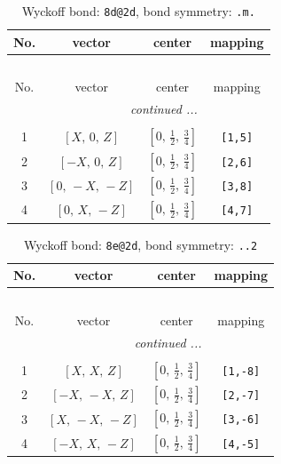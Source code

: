 \documentclass[fleqn,8pt]{jsarticle}
\begin{document}
\begin{longtable}{cccc}
\caption{Wyckoff bond: {\tt 8d@2d}, bond symmetry: {\tt .m.}}
 \\
 \hline \hline
No. & vector & center & mapping \\ \hline \endfirsthead

\multicolumn{3}{l}{\tablename\ \thetable{}} \\
 \hline \hline
No. & vector & center & mapping \\ \hline \endhead

 \hline \hline
\multicolumn{3}{r}{\footnotesize\it continued ...} \\ \endfoot

 \hline \hline
\multicolumn{3}{r}{} \\ \endlastfoot

1 & $\left[ X,\, 0,\, Z \right]$ & $\left[ 0,\, \frac{1}{2},\, \frac{3}{4} \right]$ & {\tt [1,5]} \\ \hline
2 & $\left[ - X,\, 0,\, Z \right]$ & $\left[ 0,\, \frac{1}{2},\, \frac{3}{4} \right]$ & {\tt [2,6]} \\ \hline
3 & $\left[ 0,\, - X,\, - Z \right]$ & $\left[ 0,\, \frac{1}{2},\, \frac{3}{4} \right]$ & {\tt [3,8]} \\ \hline
4 & $\left[ 0,\, X,\, - Z \right]$ & $\left[ 0,\, \frac{1}{2},\, \frac{3}{4} \right]$ & {\tt [4,7]} \\
\end{longtable}
\renewcommand{\arraystretch}{1.2}
\begin{longtable}{cccc}
\caption{Wyckoff bond: {\tt 8e@2d}, bond symmetry: {\tt ..2}}
 \\
 \hline \hline
No. & vector & center & mapping \\ \hline \endfirsthead

\multicolumn{3}{l}{\tablename\ \thetable{}} \\
 \hline \hline
No. & vector & center & mapping \\ \hline \endhead

 \hline \hline
\multicolumn{3}{r}{\footnotesize\it continued ...} \\ \endfoot

 \hline \hline
\multicolumn{3}{r}{} \\ \endlastfoot

1 & $\left[ X,\, X,\, Z \right]$ & $\left[ 0,\, \frac{1}{2},\, \frac{3}{4} \right]$ & {\tt [1,-8]} \\ \hline
2 & $\left[ - X,\, - X,\, Z \right]$ & $\left[ 0,\, \frac{1}{2},\, \frac{3}{4} \right]$ & {\tt [2,-7]} \\ \hline
3 & $\left[ X,\, - X,\, - Z \right]$ & $\left[ 0,\, \frac{1}{2},\, \frac{3}{4} \right]$ & {\tt [3,-6]} \\ \hline
4 & $\left[ - X,\, X,\, - Z \right]$ & $\left[ 0,\, \frac{1}{2},\, \frac{3}{4} \right]$ & {\tt [4,-5]} \\
\end{longtable}
\end{document}
